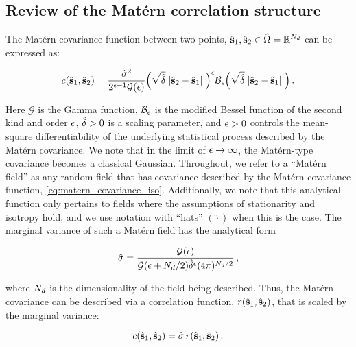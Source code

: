 \subsection{Review of the Mat\'ern correlation structure}
\label{ssec:matern_review}

The Mat\'ern covariance function between two points, $\hat{\mathbf{s}}_1,\hat{\mathbf{s}}_2\in\hat{\Omega} =
\mathbb{R}^{N_{d}}$ can be expressed as:
\begin{linenomath*}\begin{equation}
    c(\hat{\mathbf{s}}_1,\hat{\mathbf{s}}_2) = \dfrac{\hat{\sigma}^2}{2^{\epsilon-1}
    \mathcal{G}(\epsilon)}
    \Big(\sqrt{\hat{\delta}} ||\hat{\mathbf{s}}_2-\hat{\mathbf{s}}_1||\Big)^{\epsilon}
    \mathcal{B}_{\epsilon}
    \Big(\sqrt{\hat{\delta}} ||\hat{\mathbf{s}}_2-\hat{\mathbf{s}}_1||\Big) \, .
    \label{eq:matern_covariance_iso}
\end{equation}\end{linenomath*}
Here
$\mathcal{G}$ is the Gamma function,
$\mathcal{B}_{\epsilon}$ is the modified
Bessel function of the second kind and order $\epsilon$,
$\hat{\delta}>0$ is a scaling parameter, and $\epsilon>0$
controls the mean-square differentiability of the underlying statistical process
described by the Mat\'ern covariance.
We note that in the limit of $\epsilon\rightarrow\infty$, the Mat\'ern-type
covariance becomes a classical Gaussian.
Throughout, we refer to a ``Mat\'ern field'' as any random field that has
covariance described by the Mat\'ern covariance function,
\cref{eq:matern_covariance_iso}.
Additionally, we note that this analytical function only pertains to fields where the
assumptions of stationarity and isotropy hold,
and we use notation with ``hats'' $(\hat{\cdot})$ when this is the case.
The marginal variance of such a Mat\'ern field has the analytical form
\begin{linenomath*}\begin{equation}
    \hat{\sigma} = \dfrac{\mathcal{G}(\epsilon)}{
        \mathcal{G}(\epsilon + N_{d}/2)
        \hat{\delta}^{\epsilon}
        (4\pi)^{N_{d}/2}
    } \, ,
    \label{eq:matern_variance}
\end{equation}\end{linenomath*}
where $N_{d}$ is the dimensionality of the field being described.
Thus, the Mat\'ern covariance can be described via a correlation
function, $r(\hat{\mathbf{s}}_1, \hat{\mathbf{s}}_2)$, that is scaled by the marginal variance:
\begin{linenomath*}\begin{equation*}
    c(\hat{\mathbf{s}}_1, \hat{\mathbf{s}}_2) = \hat{\sigma}\,r(\hat{\mathbf{s}}_1, \hat{\mathbf{s}}_2) \, .
\end{equation*}\end{linenomath*}


